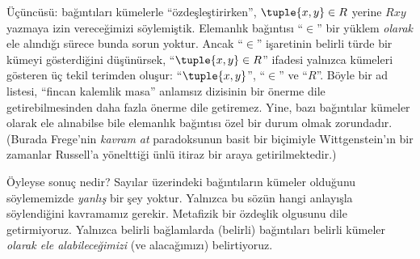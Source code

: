 Üçüncüsü: bağıntıları kümelerle ``özdeşleştirirken'', $\tuple{x,y} \in R$
yerine $Rxy$ yazmaya izin vereceğimizi söylemiştik. Elemanlık bağıntısı
``$\in$'' bir yüklem \emph{olarak} ele alındığı sürece bunda sorun yoktur. Ancak
``$\in$'' işaretinin belirli türde bir kümeyi gösterdiğini düşünürsek,
``$\tuple{x,y} \in R$'' ifadesi yalnızca kümeleri gösteren üç tekil terimden
oluşur: ``$\tuple{x,y}$'', ``$\in$'' ve ``$R$''. Böyle bir ad listesi,
``fincan kalemlik masa'' anlamsız dizisinin bir önerme dile getirebilmesinden
daha fazla önerme dile getiremez. Yine, bazı bağıntılar kümeler olarak ele
alınabilse bile elemanlık bağıntısı özel bir durum olmak zorundadır. (Burada
Frege'nin \emph{kavram at} paradoksunun basit bir biçimiyle Wittgenstein'ın bir
zamanlar Russell'a yönelttiği ünlü itiraz bir araya getirilmektedir.)

Öyleyse sonuç nedir? Sayılar üzerindeki bağıntıların kümeler olduğunu
söylememizde \emph{yanlış} bir şey yoktur. Yalnızca bu sözün hangi anlayışla
söylendiğini kavramamız gerekir. Metafizik bir özdeşlik olgusunu dile
getirmiyoruz. Yalnızca belirli bağlamlarda (belirli) bağıntıları belirli kümeler
\emph{olarak ele alabileceğimizi} (ve alacağımızı) belirtiyoruz.

